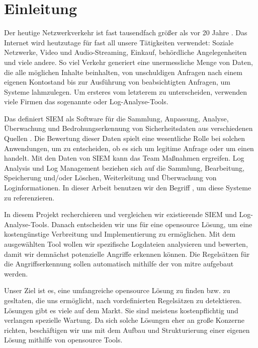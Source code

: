 \section{Einleitung}

Der heutige Netzwerkverkehr ist fast tausendfach größer als vor 20 Jahre \citep{Roser_I}. Das Internet wird heutzutage für fast all unsere Tätigkeiten verwendet: Soziale Netzwerke, Video und Audio-Streaming, Einkauf, behördliche Angelegenheiten und viele andere. So viel Verkehr generiert eine unermessliche Menge von Daten, die alle möglichen Inhalte beinhalten, von unschuldigen Anfragen nach einem eigenen Kontostand bis zur Ausführung von beabsichtigten Anfragen, um Systeme lahmzulegen. Um ersteres vom letzterem zu unterscheiden, verwenden viele Firmen das sogenannte  oder Log-Analyse-Tools. 

Das  definiert \gls{SIEM} als Software für die Sammlung, Anpassung, Analyse, Überwachung und Bedrohungserkennung von Sicherheitsdaten aus verschiedenen Quellen \citep{NIST_Definitions}. Die Bewertung dieser Daten spielt eine wesentliche Rolle bei solchen Anwendungen, um zu entscheiden, ob es sich um legitime Anfrage oder um einen  handelt. Mit den Daten von \gls{SIEM} kann das  Team Maßnahmen ergreifen. Log Analysis und Log Management beziehen sich auf die Sammlung, Bearbeitung, Speicherung und/oder Löschen, Weiterleitung und Überwachung von Loginformationen. In dieser Arbeit benutzen wir den Begriff , um diese Systeme zu referenzieren.

In diesem Projekt recherchieren und vergleichen wir existierende \gls{SIEM} und Log-Analyse-Tools. Danach entscheiden wir uns für eine \gls{opensource} Lösung, um eine kostengünstige Verbreitung und Implementierung zu ermöglichen. Mit dem ausgewählten Tool wollen wir spezifische Logdateien analysieren und bewerten, damit wir demnächst potenzielle Angriffe erkennen können. Die Regelsätzen für die Angriffserkennung sollen automatisch mithilfe der  von \gls{mitre} aufgebaut werden.

\newpage
Unser Ziel ist es, eine umfangreiche \gls{opensource} Lösung zu finden bzw. zu gesltaten, die uns ermöglicht,  nach vordefinierten Regelsätzen zu detektieren.  Lösungen gibt es viele auf dem Markt. Sie sind meistens kostenpflichtig und verlangen spezielle Wartung. Da sich solche Lösungen eher an große Konzerne richten, beschäftigen wir uns mit dem Aufbau und Strukturierung einer eigenen Lösung mithilfe von \gls{opensource} Tools. 

